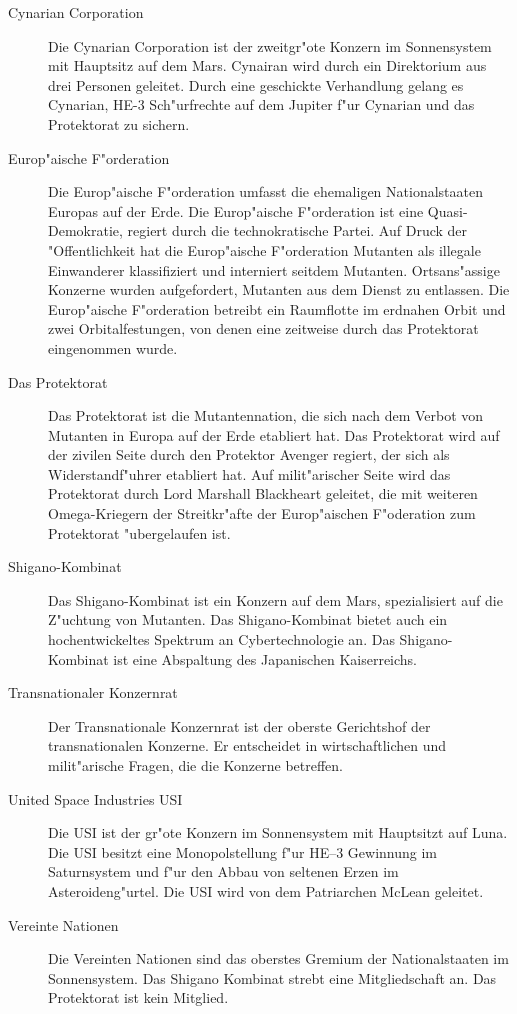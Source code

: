 \begin{appendices}
\begin{description}
\item [Cynarian Corporation] Die Cynarian Corporation ist der zweitgr"o\3te Konzern im Sonnensystem mit Hauptsitz auf
      dem Mars. Cynairan wird durch ein Direktorium aus drei Personen geleitet. Durch eine geschickte Verhandlung gelang es Cynarian, HE-3 Sch"urfrechte auf dem Jupiter f"ur Cynarian und das Protektorat zu sichern.
      \item [Europ"aische F"orderation] Die Europ"aische F"orderation umfasst die ehemaligen Nationalstaaten Europas auf der Erde. Die Europ"aische F"orderation ist eine Quasi-Demokratie, regiert durch die technokratische Partei. Auf Druck der "Offentlichkeit hat die Europ"aische F"orderation Mutanten als illegale Einwanderer klassifiziert und interniert seitdem Mutanten. Ortsans"assige Konzerne wurden aufgefordert, Mutanten aus dem Dienst zu entlassen. Die Europ"aische F"orderation betreibt ein Raumflotte im erdnahen Orbit und zwei Orbitalfestungen, von denen eine zeitweise durch das Protektorat eingenommen wurde.
\item [Das Protektorat] Das Protektorat ist die Mutantennation, die sich nach dem Verbot von Mutanten in Europa
      auf der Erde etabliert hat. Das Protektorat wird auf der zivilen Seite durch den Protektor Avenger regiert, der sich als Widerstandf"uhrer etabliert hat. Auf milit"arischer Seite wird das Protektorat durch Lord Marshall Blackheart geleitet, die mit weiteren Omega-Kriegern der Streitkr"afte der Europ"aischen F"oderation zum Protektorat "ubergelaufen ist.
\item [Shigano-Kombinat] Das Shigano-Kombinat ist ein Konzern auf dem Mars, spezialisiert auf die Z"uchtung von
      Mutanten. Das Shigano-Kombinat bietet auch ein hochentwickeltes Spektrum an Cybertechnologie an. Das Shigano-Kombinat ist eine Abspaltung des Japanischen Kaiserreichs.
\item [Transnationaler Konzernrat] Der Transnationale Konzernrat ist der oberste Gerichtshof der transnationalen
      Konzerne. Er entscheidet in wirtschaftlichen und milit"arische Fragen, die die Konzerne betreffen.
\item [United Space Industries USI] Die USI ist der gr"o\3te Konzern im Sonnensystem mit Hauptsitzt auf Luna. Die USI
      besitzt eine Monopolstellung f"ur HE--3 Gewinnung im Saturnsystem und f"ur den Abbau von seltenen Erzen im Asteroideng"urtel. Die USI wird von dem Patriarchen McLean geleitet.
\item [Vereinte Nationen] Die Vereinten Nationen sind das oberstes Gremium der Nationalstaaten im Sonnensystem. Das
      Shigano Kombinat strebt eine Mitgliedschaft an. Das Protektorat ist kein Mitglied.
\end{description}


\end{appendices}
